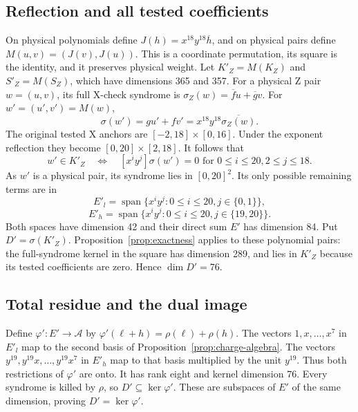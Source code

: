\documentclass{article}
\DeclareMathOperator{\Span}{span}
\begin{document}
\subsection{Reflection and all tested coefficients}\label{sec:z-reflection}

On physical polynomials define \(J(h) = x^{18} y^{18} \overline{h}\), and on physical pairs
define \(M(u,v) = (J(v), J(u))\). This is a coordinate permutation, its square is the
identity, and it preserves physical weight. Let \(K'_Z = M(K_Z)\) and \(S'_Z = M(S_Z)\),
which have dimensions 365 and 357. For a physical Z pair \(w = (u, v)\), its full X-check
syndrome is \(\sigma_Z(w) = \overline{f} u + \overline{g} v\). For \(w' = (u', v') = M(w)\),
\begin{equation}
  \sigma(w') = gu' + fv' = x^{18} y^{18} \overline{\sigma_Z(w)}.
\end{equation}
The original tested X anchors are \([-2,18] \times [0,16]\). Under the exponent reflection
they become \([0,20] \times [2,18]\). It follows that
\begin{equation}
  w' \in K'_Z \quad \Longleftrightarrow \quad
  [x^i y^j]\sigma(w') = 0
  \text{ for } 0 \le i \le 20, 2 \le j \le 18.
\end{equation}
As \(w'\) is a physical pair, its syndrome lies in \([0,20]^2\). Its only possible remaining
terms are in
\begin{equation}
  E'_l = \Span\{x^i y^j : 0 \le i \le 20, j \in \{0,1\}\},
\end{equation}
\begin{equation}
  E'_h = \Span\{x^i y^j : 0 \le i \le 20, j \in \{19,20\}\}.
\end{equation}
Both spaces have dimension 42 and their direct sum \(E'\) has dimension 84. Put
\(D' = \sigma(K'_Z)\). Proposition~\ref{prop:exactness} applies to these polynomial pairs: the
full-syndrome kernel in the square has dimension 289, and lies in \(K'_Z\) because its
tested coefficients are zero. Hence \(\dim D' = 76\).

\subsection{Total residue and the dual image}\label{sec:z-image}

Define \(\varphi' \colon E' \to \mathcal{A}\) by
\(\varphi'(\ell + h) = \rho(\ell) + \rho(h)\). The vectors \(1, x, \dots, x^7\) in \(E'_l\)
map to the second basis of Proposition~\ref{prop:charge-algebra}. The vectors
\(y^{19}, y^{19} x, \dots, y^{19} x^7\) in \(E'_h\) map to that basis multiplied by the unit
\(y^{19}\). Thus both restrictions of \(\varphi'\) are onto. It has rank eight and kernel
dimension 76. Every syndrome is killed by \(\rho\), so \(D' \subseteq \ker \varphi'\). These
are subspaces of \(E'\) of the same dimension, proving \(D' = \ker \varphi'\).
\end{document}
